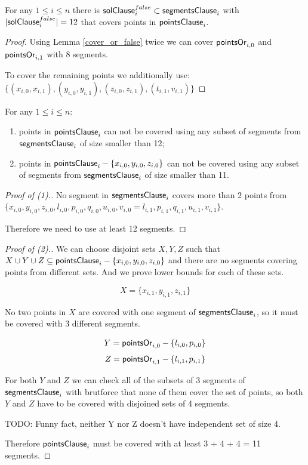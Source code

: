 \begin{lemma}
\label{cover_clauses_solution_false}
For any $1 \le i \le n$ there is
$\mathsf{solClause}^{false}_i \subset \mathsf{segmentsClause}_i$
with $|\mathsf{solClause}^{false}_i| = 12$
that covers points in $\mathsf{pointsClause}_i$.
\end{lemma}

\begin{proof}
Using Lemma \ref{cover_or_false} twice we can
cover $\mathsf{pointsOr}_{i,0}$ and  $\mathsf{pointsOr}_{i,1}$
with 8 segments.

To cover the remaining points we additionally use:
$\{ (x_{i, 0}, x_{i, 1}), (y_{i, 0}, y_{i, 1}),
(z_{i, 0}, z_{i, 1}), (t_{i, 1}, v_{i, 1}) \}$
\end{proof}

\begin{lemma}
\label{cover_clauses_segments_no_less}
For any $1 \le i \le n$:
\begin{enumerate}[label={(\arabic*)}]
	\item points in $\mathsf{pointsClause}_i$ can not be covered 
	using any subset of segments
	from $\mathsf{segmentsClause}_i$ of size smaller than 12;
	\item points in $\mathsf{pointsClause}_i - \{ x_{i, 0}, y_{i, 0}, z_{i, 0}\}$
	can not be covered using any subset of segments
	from $\mathsf{segmentsClause}_i$ of size smaller than 11.
\end{enumerate}
\end{lemma}


\begin{proof}[Proof of (1).]
No segment in $\mathsf{segmentsClause}_i$ covers more than 2 points from
$\{ x_{i, 0}, y_{i, 0}, z_{i, 0}, l_{i, 0}, p_{i, 0}, q_{i, 0},
u_{i, 0}, v_{i, 0} = l_{i, 1}, p_{i, 1}, q_{i, 1}, u_{i, 1}, v_{i, 1} \}$.

Therefore we need to use at least 12 segments.
\end{proof}

\begin{proof}[Proof of (2).]

We can choose disjoint sets $X, Y, Z$ such that
$X \cup Y \cup Z \subseteq \mathsf{pointsClause}_i - \{x_{i, 0}, y_{i, 0}, z_{i, 0}\}$
and there are no segments covering points from different sets.
And we prove lower bounds for each of these sets.

$$X = \{x_{i, 1}, y_{i, 1}, z_{i, 1}\}$$

No two points in $X$ are covered with one segment
of $\mathsf{segmentsClause}_i$, so it must be covered with 3 different segments.

$$Y = \mathsf{pointsOr}_{i,0} - \{l_{i, 0}, p_{i, 0}\}$$
$$Z = \mathsf{pointsOr}_{i,1} - \{l_{i, 1}, p_{i, 1}\}$$


For both $Y$ and $Z$ we can check all of the subsets of 3 segments
of $\mathsf{segmentsClause}_i$
with brutforce that none of them cover the set of points,
so both $Y$ and $Z$ have to be covered with 
disjoined sets of 4 segments.

TODO: Funny fact, neither Y nor Z doesn't have independent set of size 4.

Therefore $\mathsf{pointsClause}_i$ must be covered with at least 3 + 4 + 4 = 11 segments.
\end{proof}


